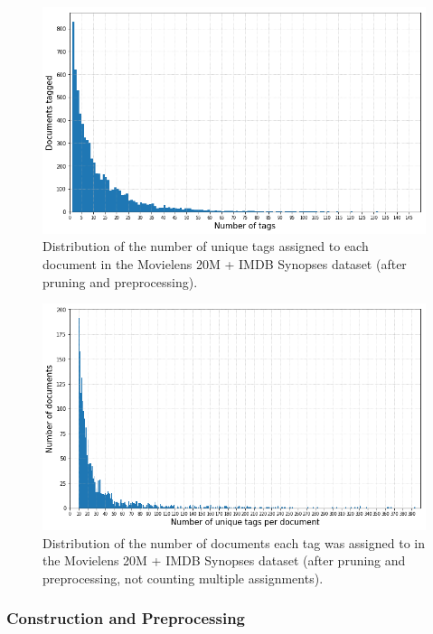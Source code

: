 \begin{figure}[!h]
    \centering
    \includegraphics[width=\textwidth]{chapters/05_experiments/images/movielens_tags_per_resource.png}
    \caption{Distribution of the number of unique tags assigned to each document in the Movielens 20M + IMDB Synopses dataset (after pruning and preprocessing).}
    \label{fig:delicious_tag_doc_distr}
\end{figure}

\begin{figure}[!h]
    \centering
    \includegraphics[width=\textwidth]{chapters/05_experiments/images/movielens_resources_per_tag.png}
    \caption{Distribution of the number of documents each tag was assigned to in the Movielens 20M + IMDB Synopses dataset (after pruning and preprocessing, not counting multiple assignments).}
    \label{fig:delicious_tag_doc_distr}
\end{figure}

\subsubsection{Construction and Preprocessing}

